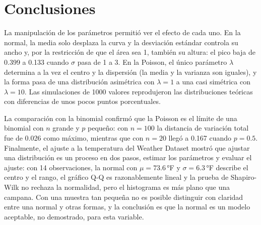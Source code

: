 \documentclass[11pt,letterpaper]{article}
\begin{document}
\section{Conclusiones}

La manipulación de los parámetros permitió ver el efecto de cada uno. En la normal, la media solo desplaza la curva y la desviación estándar controla su ancho y, por la restricción de que el área sea 1, también su altura: el pico baja de 0.399 a 0.133 cuando $\sigma$ pasa de 1 a 3. En la Poisson, el único parámetro $\lambda$ determina a la vez el centro y la dispersión (la media y la varianza son iguales), y la forma pasa de una distribución asimétrica con $\lambda = 1$ a una casi simétrica con $\lambda = 10$. Las simulaciones de 1000 valores reprodujeron las distribuciones teóricas con diferencias de unos pocos puntos porcentuales.

La comparación con la binomial confirmó que la Poisson es el límite de una binomial con $n$ grande y $p$ pequeño: con $n = 100$ la distancia de variación total fue de 0.026 como máximo, mientras que con $n = 20$ llegó a 0.167 cuando $p = 0.5$. Finalmente, el ajuste a la temperatura del Weather Dataset mostró que ajustar una distribución es un proceso en dos pasos, estimar los parámetros y evaluar el ajuste: con 14 observaciones, la normal con $\mu = 73.6$\,°F y $\sigma = 6.3$\,°F describe el centro y el rango, el gráfico Q-Q es razonablemente lineal y la prueba de Shapiro-Wilk no rechaza la normalidad, pero el histograma es más plano que una campana. Con una muestra tan pequeña no es posible distinguir con claridad entre una normal y otras formas, y la conclusión es que la normal es un modelo aceptable, no demostrado, para esta variable.

\end{document}
